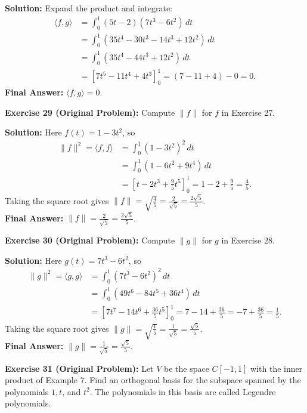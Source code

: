 \documentclass[11pt, letterpaper]{article}
\theoremstyle{definition}
\theoremstyle{remark}
\begin{document}
\textbf{Solution:}
Expand the product and integrate:
\begin{align*}
    \langle f, g \rangle &= \int_0^1 (5t - 2)(7t^3 - 6t^2)\,dt \\
    &= \int_0^1 (35t^4 - 30t^3 - 14t^3 + 12t^2)\,dt \\
    &= \int_0^1 (35t^4 - 44t^3 + 12t^2)\,dt \\
    &= \left[ 7t^5 - 11t^4 + 4t^3 \right]_0^1 = (7 - 11 + 4) - 0 = 0.
\end{align*}
\textbf{Final Answer:} $\langle f, g \rangle = 0$.

\textbf{Exercise 29 (Original Problem):} Compute $\|f\|$ for $f$ in Exercise 27.

\textbf{Solution:}
Here $f(t) = 1 - 3t^2$, so
\begin{align*}
    \|f\|^2 = \langle f, f \rangle &= \int_0^1 (1 - 3t^2)^2\,dt \\
    &= \int_0^1 (1 - 6t^2 + 9t^4)\,dt \\
    &= \left[ t - 2t^3 + \frac{9}{5}t^5 \right]_0^1 = 1 - 2 + \frac{9}{5} = \frac{4}{5}.
\end{align*}
Taking the square root gives $\|f\| = \sqrt{\frac{4}{5}} = \frac{2}{\sqrt{5}} = \frac{2\sqrt{5}}{5}$.\\
\textbf{Final Answer:} $\displaystyle \|f\| = \frac{2}{\sqrt{5}} = \frac{2\sqrt{5}}{5}$.

\textbf{Exercise 30 (Original Problem):} Compute $\|g\|$ for $g$ in Exercise 28.

\textbf{Solution:}
Here $g(t) = 7t^3 - 6t^2$, so
\begin{align*}
    \|g\|^2 = \langle g, g \rangle &= \int_0^1 (7t^3 - 6t^2)^2\,dt \\
    &= \int_0^1 (49t^6 - 84t^5 + 36t^4)\,dt \\
    &= \left[ 7t^7 - 14t^6 + \frac{36}{5}t^5 \right]_0^1 = 7 - 14 + \frac{36}{5} = -7 + \frac{36}{5} = \frac{1}{5}.
\end{align*}
Taking the square root gives $\|g\| = \sqrt{\frac{1}{5}} = \frac{1}{\sqrt{5}} = \frac{\sqrt{5}}{5}$.\\
\textbf{Final Answer:} $\displaystyle \|g\| = \frac{1}{\sqrt{5}} = \frac{\sqrt{5}}{5}$.

\textbf{Exercise 31 (Original Problem):} Let $V$ be the space $C[-1, 1]$ with the inner product of Example 7. Find an orthogonal basis for the subspace spanned by the polynomials $1, t$, and $t^2$. The polynomials in this basis are called Legendre polynomials.
\end{document}
